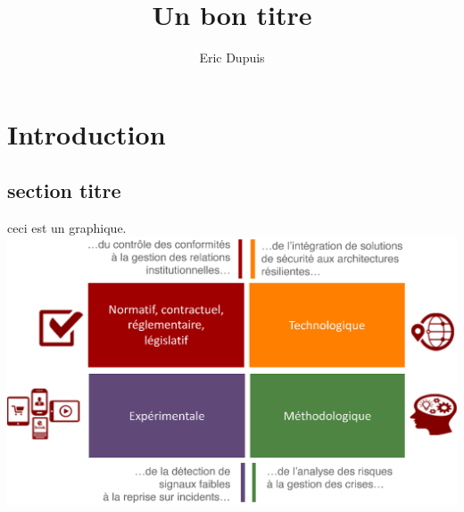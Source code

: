 \documentclass[pagesize=a4,
               headinclude=on,footinclude=on,11pt]{book}
\begin{document}
\title{Un bon titre}
\author{Eric Dupuis}
\chapter{Introduction}
\section{section titre}
ceci est un graphique.
\includegraphics{Tex/Pictures/img-4model.eps}
\end{document}

